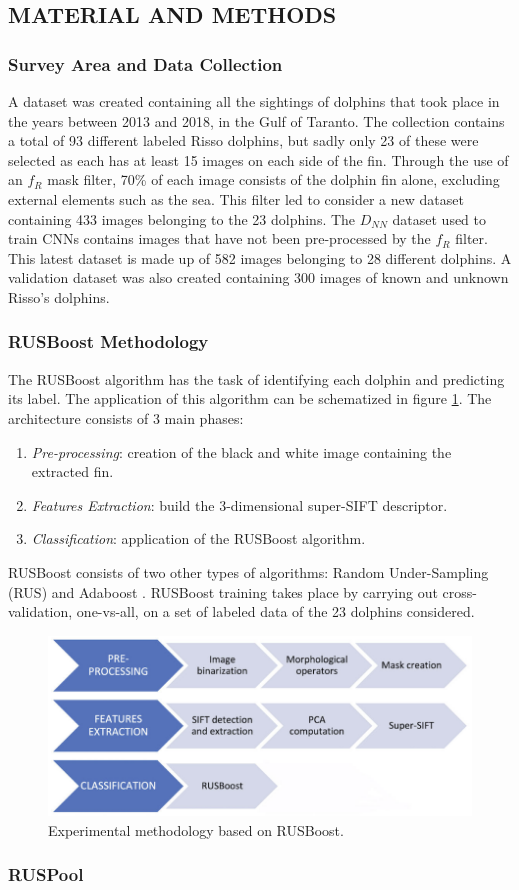 \subsection{MATERIAL AND METHODS}
\subsubsection{Survey Area and Data Collection}
A dataset was created containing all the sightings of dolphins that took place 
in the years between 2013 and 2018, in the Gulf of Taranto. The collection 
contains a total of 93 different labeled Risso dolphins, but sadly only 23 of 
these were selected as each has at least 15 images on each side of the fin. 
Through the use of an $f_R$ mask filter, 70\% of each image consists of the 
dolphin fin alone, excluding external elements such as the sea. This filter 
led to consider a new dataset containing 433 images belonging to the 23 
dolphins. The $D_{NN}$ dataset used to train CNNs contains images that have 
not been pre-processed by the $f_R$ filter. This latest dataset is made up of 
582 images belonging to 28 different dolphins. A validation dataset was also 
created containing 300 images of known and unknown Risso's dolphins.

\subsubsection{RUSBoost Methodology}
The RUSBoost algorithm has the task of identifying each dolphin and predicting 
its label. The application of this algorithm can be schematized in 
figure \ref{fig:RUSBoost}. The architecture consists of 3 main phases:
\begin{enumerate}
    \item \emph{Pre-processing}: creation of the black and white image containing the 
    extracted fin.
    \item \emph{Features Extraction}: build the 3-dimensional super-SIFT descriptor. 
    \item \emph{Classification}: application of the RUSBoost algorithm.
\end{enumerate}
RUSBoost consists of two other types of algorithms: Random Under-Sampling 
(RUS) and Adaboost \cite{0907875811}. RUSBoost training takes place by carrying out 
cross-validation, one-vs-all, on a set of labeled data of the 23 dolphins considered.
\begin{figure}[h!]
    \centering
    \includegraphics[width = 0.8\linewidth]{images/paper10/RUSBoost.png}
    \centering
    \caption{Experimental methodology based on RUSBoost.}
    \label{fig:RUSBoost}
\end{figure}

\subsubsection{RUSPool}
